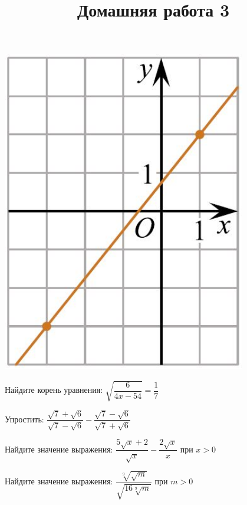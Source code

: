 \begin{homework}[number=2]
\begin{listofex}
\begin{minipage}[c]{0.2\textwidth}
			\includegraphics[align=t, width=0.8\textwidth]{pics/G112M3C2-1}
		\end{minipage}
		\item Найдите корень уравнения:
		\( \sqrt{\dfrac{6}{4x-54}}=\dfrac{1}{7} \)
		\item Упростить:
		\( \dfrac{\sqrt{7}+\sqrt{6}}{\sqrt{7}-\sqrt{6}}-\dfrac{\sqrt{7}-\sqrt{6}}{\sqrt{7}+\sqrt{6}} \)
		\item Найдите значение выражения:
		\( \dfrac{5\sqrt{x}+2}{\sqrt{x}}-\dfrac{2\sqrt{x}}{x} \) при \( x>0 \)
		\item Найдите значение выражения:
		\( \dfrac{\sqrt[9]{\sqrt{m}}}{\sqrt{16\sqrt[9]{m}}} \) при \( m>0 \)
	\end{listofex}
\end{homework}
%	
%	
\newpage
\title{Домашняя работа 3}
